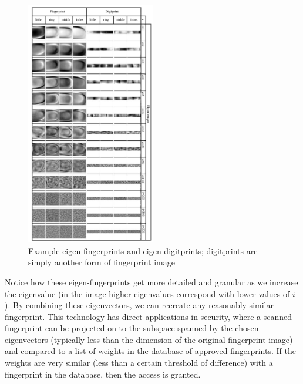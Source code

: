 \documentclass[12pt]{report}
\begin{document}
            \begin{figure}[H]
                \centering
                \includegraphics[width=0.5\textwidth]{eigenfingerprints.png}
                \caption{Example eigen-fingerprints and eigen-digitprints; digitprints are simply another form of fingerprint image \cite{Pavesic2022}}
            \end{figure}

            Notice how these eigen-fingerprints get more detailed and granular as we increase the eigenvalue (in the image higher eigenvalues correspond with lower values of $i$). By combining these eigenvectors, we can recreate any reasonably similar fingerprint. This technology has direct applications in security, where a scanned fingerprint can be projected on to the subspace spanned by the chosen eigenvectors (typically less than the dimension of the original fingerprint image) and compared to a list of weights in the database of approved fingerprints. If the weights are very similar (less than a certain threshold of difference) with a fingerprint in the database, then the access is granted.
\end{document}
